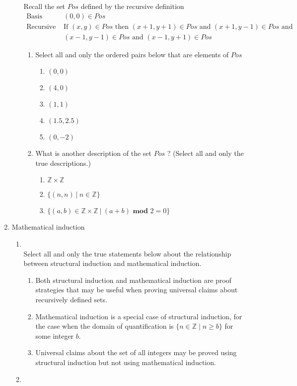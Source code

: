 \documentclass[12pt, oneside]{article}
\begin{document}
\begin{enumerate}
\begin{enumerate}
Recall the set $Pos$ defined by the recursive definition
\[
\begin{array}{ll}
    \textrm{Basis Step: } & (0,0) \in Pos\\
     \textrm{Recursive Step: } & \textrm{If } (x,y) \in Pos \textrm{ then } 
     (x+1, y+1) \in Pos \textrm{ and } (x+1, y-1) \in Pos \textrm{ and }\\ 
     & (x-1,y-1) \in Pos 
     \textrm{ and } (x-1, y+1) \in Pos
\end{array}
\]
\begin{enumerate}
\item Select all and only the ordered pairs below that are elements of $Pos$
\begin{enumerate}
\item $(0,0)$
\item $(4,0)$
\item $(1,1)$
\item $(1.5,2.5)$
\item $(0, -2)$
\end{enumerate}
\item What is another description of the set $Pos$ ? (Select all and only the true descriptions.)
\begin{enumerate}
\item $\mathbb{Z} \times \mathbb{Z}$
\item $\{ (n,n) ~|~ n \in \mathbb{Z} \}$
\item $\{ (a,b) \in \mathbb{Z} \times \mathbb{Z} ~|~ (a+b) \textbf{ mod } 2 =0 \}$
\end{enumerate}
\end{enumerate} \end{enumerate}
\item Mathematical induction
\begin{enumerate}
    \item \hspace{1in}\\ 

Select all and only the true statements below about the relationship between
structural induction and mathematical induction.
\begin{enumerate}
    \item Both structural induction and mathematical induction are proof strategies that 
    may be useful when proving universal claims about recursively defined sets.
    \item Mathematical induction is a special case of structural induction, for the case when 
    the domain of quantification is $\{ n \in \mathbb{Z} \mid n \geq b\}$ for some integer $b$.
    \item Universal claims about the set of all integers may be proved using structural induction
    but not using mathematical induction.
\end{enumerate}     \item \hspace{1in}\\ 


\end{enumerate}
\end{enumerate}
\end{document}
